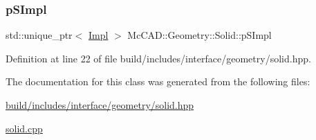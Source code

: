 \subsubsection{\texorpdfstring{p\+S\+Impl}{pSImpl}}
{\footnotesize\ttfamily std\+::unique\+\_\+ptr$<$ \hyperlink{classMcCAD_1_1Geometry_1_1Solid_1_1Impl}{Impl} $>$ Mc\+C\+A\+D\+::\+Geometry\+::\+Solid\+::p\+S\+Impl\hspace{0.3cm}{\ttfamily [private]}}



Definition at line 22 of file build/includes/interface/geometry/solid.\+hpp.



The documentation for this class was generated from the following files\+:\begin{DoxyCompactItemize}
\item 
\hyperlink{build_2includes_2interface_2geometry_2solid_8hpp}{build/includes/interface/geometry/solid.\+hpp}\item 
\hyperlink{solid_8cpp}{solid.\+cpp}\end{DoxyCompactItemize}
